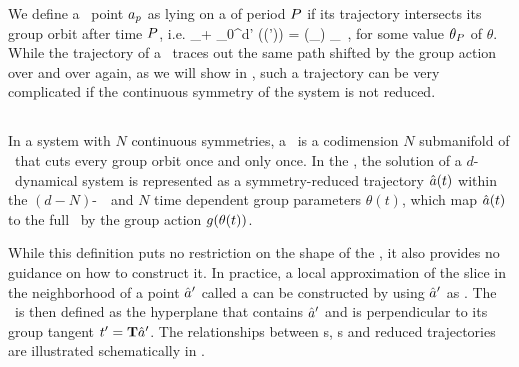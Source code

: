 We define a \statesp\ point $a_{p}$ as lying on a \emph{\rpo} of period $P$ if its trajectory intersects its group orbit after time $P$, i.e.
\beq
  \ssp_\rpprime  + \int_0^\pd d\tau' \vel(\ssp (\tau')) = \LieEl (\theta_\rpprime ) \ssp_\rpprime
  \,,
\noindent for some value $\theta_{P}$ of $\theta$. While the trajectory of a \rpo\ traces out the same path shifted
by the group action over and over again, as we will show in , such a trajectory can be very complicated if the
continuous symmetry of the system is not reduced.

\subsection{\Mslices}
\label{s-slice}

In a system with $N$ continuous symmetries, a \emph{\slice} \pSRed\ is a codimension $N$ submanifold 
of \pS\ that cuts every group orbit once and only once. In the \emph{\mslices}, the solution
of a $d$-\dmn\ dynamical system is represented as a symmetry-reduced trajectory $\hat{a} (t)$ within the
$(d-N)$-\dmn\ \slice\ and $N$ time dependent group parameters $\theta(t)$, which
map $\hat{a} (t)$ to the full \statesp\ by the group action $g(\theta(t))$.

While this definition puts no restriction on the shape of the
\slice, it also provides no guidance on how to construct it.
In practice, a local approximation of the slice in the neighborhood of a point ${\hat{a}'}$ called a \emph{\slicePlane}
can be constructed by using ${\hat{a}'}$ as \emph{\template}. The \slicePlane\ is then defined as the hyperplane
that contains ${\hat{a}'}$ and is perpendicular to its group tangent $t'_{} = \mathbf{T} {\hat{a}'}$.
The relationships between \slicePlane s, \template s and reduced trajectories are illustrated schematically in .

